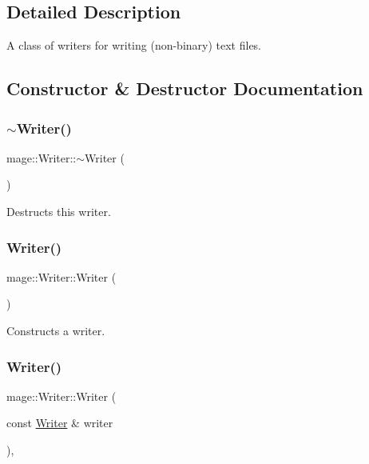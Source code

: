 \subsection{Detailed Description}
A class of writers for writing (non-\/binary) text files. 

\subsection{Constructor \& Destructor Documentation}
\hypertarget{classmage_1_1_writer_aeeb30d6afb1a271b4ad294889054caec}{}\label{classmage_1_1_writer_aeeb30d6afb1a271b4ad294889054caec} 
\subsubsection{\texorpdfstring{$\sim$\+Writer()}{~Writer()}}
{\footnotesize\ttfamily mage\+::\+Writer\+::$\sim$\+Writer (\begin{DoxyParamCaption}{ }\end{DoxyParamCaption})\hspace{0.3cm}{\ttfamily [virtual]}}

Destructs this writer. \hypertarget{classmage_1_1_writer_a40b6cd3005d509e670c5a49272d9ef27}{}\label{classmage_1_1_writer_a40b6cd3005d509e670c5a49272d9ef27} 
\subsubsection{\texorpdfstring{Writer()}{Writer()}\hspace{0.1cm}{\footnotesize\ttfamily [1/3]}}
{\footnotesize\ttfamily mage\+::\+Writer\+::\+Writer (\begin{DoxyParamCaption}{ }\end{DoxyParamCaption})\hspace{0.3cm}{\ttfamily [protected]}}

Constructs a writer. \hypertarget{classmage_1_1_writer_a2b257938508732ca0b78241aafa7922c}{}\label{classmage_1_1_writer_a2b257938508732ca0b78241aafa7922c} 
\subsubsection{\texorpdfstring{Writer()}{Writer()}\hspace{0.1cm}{\footnotesize\ttfamily [2/3]}}
{\footnotesize\ttfamily mage\+::\+Writer\+::\+Writer (\begin{DoxyParamCaption}\item[{const \hyperlink{classmage_1_1_writer}{Writer} \&}]{writer }\end{DoxyParamCaption})\hspace{0.3cm}{\ttfamily [protected]}, {\ttfamily [delete]}}

